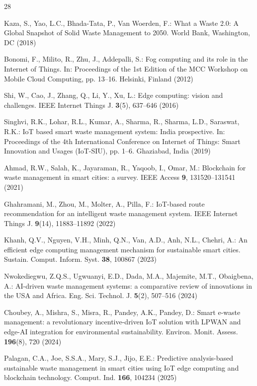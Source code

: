 \documentclass{llncs}
\begin{document}
\begin{thebibliography}{28}

Kaza, S., Yao, L.C., Bhada-Tata, P., Van Woerden, F.: What a Waste 2.0: A
Global Snapshot of Solid Waste Management to 2050. World Bank, Washington,
DC (2018)

Bonomi, F., Milito, R., Zhu, J., Addepalli, S.: Fog computing and its role in
the Internet of Things. In: Proceedings of the 1st Edition of the MCC Workshop
on Mobile Cloud Computing, pp. 13--16. Helsinki, Finland (2012)

Shi, W., Cao, J., Zhang, Q., Li, Y., Xu, L.: Edge computing: vision and
challenges. IEEE Internet Things J. \textbf{3}(5), 637--646 (2016)

Singhvi, R.K., Lohar, R.L., Kumar, A., Sharma, R., Sharma, L.D.,
Saraswat, R.K.: IoT based smart waste management system: India prospective.
In: Proceedings of the 4th International Conference on Internet of Things:
Smart Innovation and Usages (IoT-SIU), pp. 1--6. Ghaziabad, India (2019)

Ahmad, R.W., Salah, K., Jayaraman, R., Yaqoob, I., Omar, M.: Blockchain for
waste management in smart cities: a survey. IEEE Access \textbf{9},
131520--131541 (2021)

Ghahramani, M., Zhou, M., Molter, A., Pilla, F.: IoT-based route
recommendation for an intelligent waste management system. IEEE Internet
Things J. \textbf{9}(14), 11883--11892 (2022)

Khanh, Q.V., Nguyen, V.H., Minh, Q.N., Van, A.D., Anh, N.L., Chehri, A.: An
efficient edge computing management mechanism for sustainable smart cities.
Sustain. Comput. Inform. Syst. \textbf{38}, 100867 (2023)

Nwokediegwu, Z.Q.S., Ugwuanyi, E.D., Dada, M.A., Majemite, M.T.,
Obaigbena, A.: AI-driven waste management systems: a comparative review of
innovations in the USA and Africa. Eng. Sci. Technol. J. \textbf{5}(2),
507--516 (2024)

Choubey, A., Mishra, S., Misra, R., Pandey, A.K., Pandey, D.: Smart e-waste
management: a revolutionary incentive-driven IoT solution with LPWAN and
edge-AI integration for environmental sustainability. Environ. Monit. Assess.
\textbf{196}(8), 720 (2024)

Palagan, C.A., Joe, S.S.A., Mary, S.J., Jijo, E.E.: Predictive
analysis-based sustainable waste management in smart cities using IoT edge
computing and blockchain technology. Comput. Ind. \textbf{166}, 104234 (2025)


\end{thebibliography}
\end{document}
